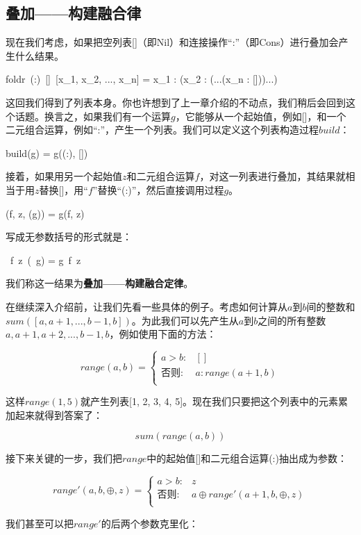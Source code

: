 \documentclass{article}
\begin{document}
\subsection{叠加——构建融合律}
现在我们考虑，如果把空列表[]（即Nil）和连接操作“:”（即Cons）进行叠加会产生什么结果。

\be
foldr\ (:)\ []\ [x_1, x_2, ..., x_n] = x_1 : (x_2 : (...(x_n : []))...)
\label{eq:foldr-fixed-point}
\ee

这回我们得到了列表本身。你也许想到了上一章介绍的不动点，我们稍后会回到这个话题。换言之，如果我们有一个运算$g$，它能够从一个起始值，例如[]，和一个二元组合运算，例如“:”，产生一个列表。我们可以定义这个列表构造过程$build$：

\be
build(g) = g((:), [])
\label{eq:build-definition}
\ee

接着，如果用另一个起始值$z$和二元组合运算$f$，对这一列表进行叠加，其结果就相当于用$z$替换[]，用“$f$”替换“(:)”，然后直接调用过程$g$。

\be
{}(f, z, (g)) = g(f, z)
\ee

写成无参数括号的形式就是：

\be
{}\ f\ z\ (\ g) = g\ f\ z
\label{eq:foldr-build-fusion-law}
\ee

我们称这一结果为\textbf{叠加——构建融合定律}。

在继续深入介绍前，让我们先看一些具体的例子。考虑如何计算从$a$到$b$间的整数和$sum([a, a+1, ..., b-1, b])$。为此我们可以先产生从$a$到$b$之间的所有整数$a, a+1, a+2, ..., b-1, b$，例如使用下面的方法：

\[
range(a, b) =
\begin{cases}
a > b: & [] \\
\text{否则}: & a : range(a+1, b) \\
\end{cases}
\]

这样$range(1, 5)$就产生列表[1, 2, 3, 4, 5]。现在我们只要把这个列表中的元素累加起来就得到答案了：

\[
sum(range(a, b))
\]

接下来关键的一步，我们把$range$中的起始值[]和二元组合运算(:)抽出成为参数：

\[
range'(a, b, \oplus, z) =
  \begin{cases}
  a > b: & z \\
  \text{否则}: & a \oplus range'(a+1, b, \oplus, z) \\
  \end{cases}
\]

我们甚至可以把$range'$的后两个参数克里化：
\end{document}
